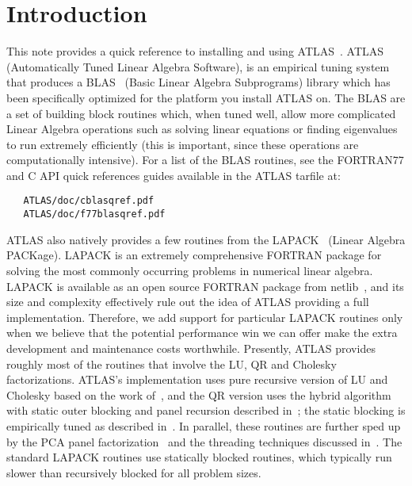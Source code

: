\documentclass[11pt]{article}
\begin{document}
\section{Introduction}
This note provides a quick reference to installing and using 
ATLAS~\cite{atlas-hp,atlas_wn97,atlas_sc98,atlas_siam,WN147,whaley04}.  ATLAS
(Automatically Tuned Linear Algebra Software), is an empirical tuning
system that produces a BLAS~\cite{blas3,blas2a,blas2b,blas1a,blas1b}
(Basic Linear Algebra Subprograms) library which has been specifically optimized
for the platform you install ATLAS on.  The BLAS are a set of building block
routines which, when tuned well, allow more complicated Linear Algebra 
operations such as solving linear equations or finding eigenvalues to run
extremely efficiently (this is important, since these operations are
computationally intensive).  For a list of the BLAS routines, see the FORTRAN77
and C API quick references guides available in the ATLAS tarfile at:
\begin{verbatim}
   ATLAS/doc/cblasqref.pdf
   ATLAS/doc/f77blasqref.pdf
\end{verbatim}

ATLAS also natively provides a few routines from the LAPACK~\cite{lug}
(Linear Algebra PACKage).  LAPACK is an extremely comprehensive
FORTRAN package for solving the most commonly occurring problems in numerical
linear algebra.  LAPACK is available as an open source FORTRAN package from
netlib~\cite{lapack-hp}, and its size and complexity effectively rule out the
idea of ATLAS providing a full implementation.  Therefore, we add support
for particular LAPACK routines only when we believe that the potential
performance win we can offer make the extra development and maintenance
costs worthwhile.  Presently, ATLAS provides roughly most of the routines
that involve the LU, QR and Cholesky factorizations.  ATLAS's implementation
uses pure recursive version of LU and Cholesky based on the work 
of~\cite{Toledo-LU,RecFred,gustavson98A,WN146}, and the QR version 
uses the hybrid algorithm
with static outer blocking and panel recursion described in~\cite{RecQR};
the static blocking is empirically tuned as described in~\cite{lanb08}.
In parallel, these routines are further sped up by the PCA panel 
factorization~\cite{panel10} and the threading techniques discussed
in~\cite{thr08}.  The standard LAPACK routines use statically blocked
routines, which typically run slower than recursively blocked for all
problem sizes. 
\end{document}

